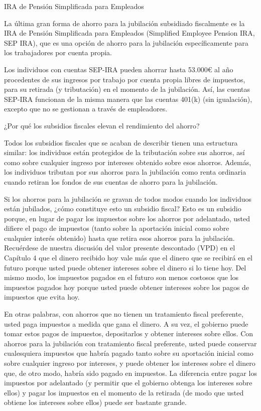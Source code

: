 \documentclass[10pt,a4paper]{article}
\begin{document}
IRA de Pensión Simplificada para Empleados

La última gran forma de ahorro para la jubilación subsidiado fiscalmente es la IRA de Pensión Simplificada para Empleados (Simplified Employee Pension IRA, SEP IRA), que es una opción de ahorro para la jubilación específicamente para los trabajadores por cuenta propia.

Los individuos con cuentas SEP-IRA pueden ahorrar hasta 53.000€ al año procedentes de sus ingresos por trabajo por cuenta propia libres de impuestos, para su retirada (y tributación) en el momento de la jubilación. Así, las cuentas SEP-IRA funcionan de la misma manera que las cuentas 401(k) (sin igualación), excepto que no se gestionan a través de empleadores.

¿Por qué los subsidios fiscales elevan el rendimiento del ahorro?

Todos los subsidios fiscales que se acaban de describir tienen una estructura similar: los individuos están protegidos de la tributación sobre sus ahorros, así como sobre cualquier ingreso por intereses obtenido sobre esos ahorros. Además, los individuos tributan por sus ahorros para la jubilación como renta ordinaria cuando retiran los fondos de sus cuentas de ahorro para la jubilación.

Si los ahorros para la jubilación se gravan de todos modos cuando los individuos están jubilados, ¿cómo constituye esto un subsidio fiscal? Esto es un subsidio porque, en lugar de pagar los impuestos sobre los ahorros por adelantado, usted difiere el pago de impuestos (tanto sobre la aportación inicial como sobre cualquier interés obtenido) hasta que retira esos ahorros para la jubilación. Recuérdese de nuestra discusión del valor presente descontado (VPD) en el Capítulo 4 que el dinero recibido hoy vale más que el dinero que se recibirá en el futuro porque usted puede obtener intereses sobre el dinero si lo tiene hoy. Del mismo modo, los impuestos pagados en el futuro son menos costosos que los impuestos pagados hoy porque usted puede obtener intereses sobre los pagos de impuestos que evita hoy.

En otras palabras, con ahorros que no tienen un tratamiento fiscal preferente, usted paga impuestos a medida que gana el dinero. A su vez, el gobierno puede tomar estos pagos de impuestos, depositarlos y obtener intereses sobre ellos. Con ahorros para la jubilación con tratamiento fiscal preferente, usted puede conservar cualesquiera impuestos que habría pagado tanto sobre su aportación inicial como sobre cualquier ingreso por intereses, y puede obtener los intereses sobre el dinero que, de otro modo, habría sido pagado en impuestos. La diferencia entre pagar los impuestos por adelantado (y permitir que el gobierno obtenga los intereses sobre ellos) y pagar los impuestos en el momento de la retirada (de modo que usted obtiene los intereses sobre ellos) puede ser bastante grande.
\end{document}
